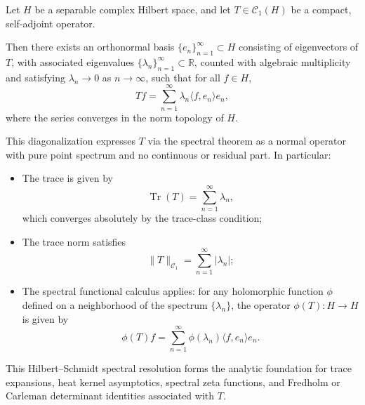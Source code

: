 \begin{definition}
\label{def:spectral-decomposition-compact}
Let \( H \) be a separable complex Hilbert space, and let \( T \in \mathcal{C}_1(H) \) be a compact, self-adjoint operator.

Then there exists an orthonormal basis \( \{ e_n \}_{n=1}^\infty \subset H \) consisting of eigenvectors of \( T \), with associated eigenvalues \( \{ \lambda_n \}_{n=1}^\infty \subset \mathbb{R} \), counted with algebraic multiplicity and satisfying \( \lambda_n \to 0 \) as \( n \to \infty \), such that for all \( f \in H \),
\[
T f = \sum_{n=1}^\infty \lambda_n \langle f, e_n \rangle e_n,
\]
where the series converges in the norm topology of \( H \).

\medskip
\noindent
This diagonalization expresses \( T \) via the spectral theorem as a normal operator with pure point spectrum and no continuous or residual part. In particular:
\begin{itemize}
  \item The trace is given by
  \[
  \operatorname{Tr}(T) = \sum_{n=1}^\infty \lambda_n,
  \]
  which converges absolutely by the trace-class condition;

  \item The trace norm satisfies
  \[
  \|T\|_{\mathcal{C}_1} = \sum_{n=1}^\infty |\lambda_n|;
  \]

  \item The spectral functional calculus applies: for any holomorphic function \( \phi \) defined on a neighborhood of the spectrum \( \{\lambda_n\} \), the operator \( \phi(T) \colon H \to H \) is given by
  \[
  \phi(T) f = \sum_{n=1}^\infty \phi(\lambda_n) \langle f, e_n \rangle e_n.
  \]
\end{itemize}

\medskip
\noindent
This Hilbert–Schmidt spectral resolution forms the analytic foundation for trace expansions, heat kernel asymptotics, spectral zeta functions, and Fredholm or Carleman determinant identities associated with \( T \).
\end{definition}
% 